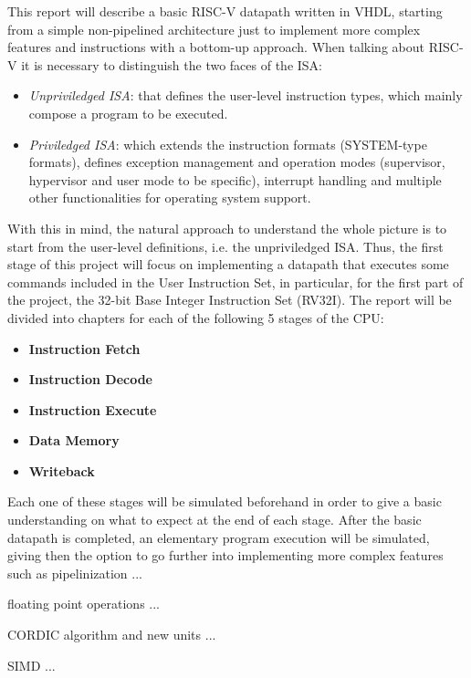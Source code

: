 This report will describe a basic RISC-V datapath written in VHDL, starting from a simple non-pipelined architecture just to implement more complex features and instructions with a bottom-up approach.
When talking about RISC-V it is necessary to distinguish the two faces of the ISA:
\begin{itemize}
    \item \emph{Unpriviledged ISA}: that defines the user-level instruction types, which mainly compose a program to be executed.
    \item \emph{Priviledged ISA}: which extends the instruction formats (SYSTEM-type formats), defines exception management and operation modes (supervisor, hypervisor and user mode to be specific), interrupt handling and multiple other functionalities for operating system support.
\end{itemize}
With this in mind, the natural approach to understand the whole picture is to start from the user-level definitions, i.e. the unpriviledged ISA.
Thus, the first stage of this project will focus on implementing a datapath that executes some commands included in the User Instruction Set, in particular, for the first part of the project, the 32-bit Base Integer Instruction Set (RV32I).
The report will be divided into chapters for each of the following 5 stages of the CPU:
\begin{itemize}
\item \textbf{Instruction Fetch}
\item \textbf{Instruction Decode} 
\item \textbf{Instruction Execute} 
\item \textbf{Data Memory}
\item \textbf{Writeback} 
\end{itemize}
Each one of these stages will be simulated beforehand in order to give a basic understanding on what to expect at the end of each stage. After the basic datapath is completed, an elementary program execution will be simulated, giving then the option to go further into implementing more complex features such as pipelinization ...
 
floating point operations ...

CORDIC algorithm and new units ...

SIMD ...
\let\cleardoublepage\clearpage